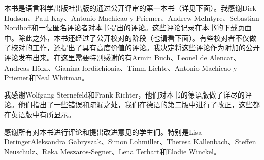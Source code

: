 
本书是语言科学出版社出版的通过公开评审的第一本书（详见下面）。我感谢Dick Hudson、Paul Kay、Antonio Machicao y Priemer、Andrew McIntyre、Sebastian Nordhoff和一位匿名评论者对本书提出的评论。这些评论记录在\href{\lsURL}{本书的下载页面}中。除此之外，本书还经过了公开校对的阶段（也请看下面）。有些校对者不仅做了校对的工作，还提出了具有高度价值的评论。我决定将这些评论作为附加的公开评论发布出来。在这里需要特别感谢的有Armin Buch、Leonel de Alencar、Andreas Hölzl、Gianina Iordăchioaia、Timm Lichte、Antonio Machicao y Priemer和Neal Whitman。

我感谢Wolfgang Sternefeld和Frank Richter，他们对本书的德语版做了详尽的评论。他们指出了一些错误和疏漏之处，我们在德语的第二版中进行了改正，这些都在英语版中有所显示。

感谢所有对本书进行评论和提出改进意见的学生们。特别是Lisa DeringerAleksandra Gabryszak、Simon Lohmiller、Theresa Kallenbach、Steffen Neu\-schulz、Reka Meszaros-Segner、Lena Terhart和Elodie Winckel。

